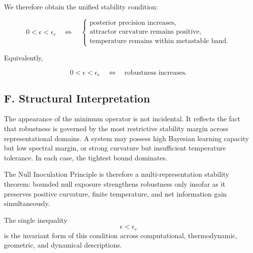 \documentclass[11pt]{article}
\theoremstyle{remark}
\begin{document}
We therefore obtain the unified stability condition:

\[
0 < \epsilon < \epsilon_c
\quad \Longleftrightarrow \quad
\begin{cases}
\text{posterior precision increases}, \\
\text{attractor curvature remains positive}, \\
\text{temperature remains within metastable band}.
\end{cases}
\]

Equivalently,

\[
0 < \epsilon < \epsilon_c
\quad \Longleftrightarrow \quad
\text{robustness increases}.
\]

\subsection*{F. Structural Interpretation}

The appearance of the minimum operator is not incidental. It reflects the fact that robustness is governed by the most restrictive stability margin across representational domains. A system may possess high Bayesian learning capacity but low spectral margin, or strong curvature but insufficient temperature tolerance. In each case, the tightest bound dominates.

The Null Inoculation Principle is therefore a multi-representation stability theorem: bounded null exposure strengthens robustness only insofar as it preserves positive curvature, finite temperature, and net information gain simultaneously.

The single inequality
\[
\epsilon < \epsilon_c
\]
is the invariant form of this condition across computational, thermodynamic, geometric, and dynamical descriptions.
\end{document}
